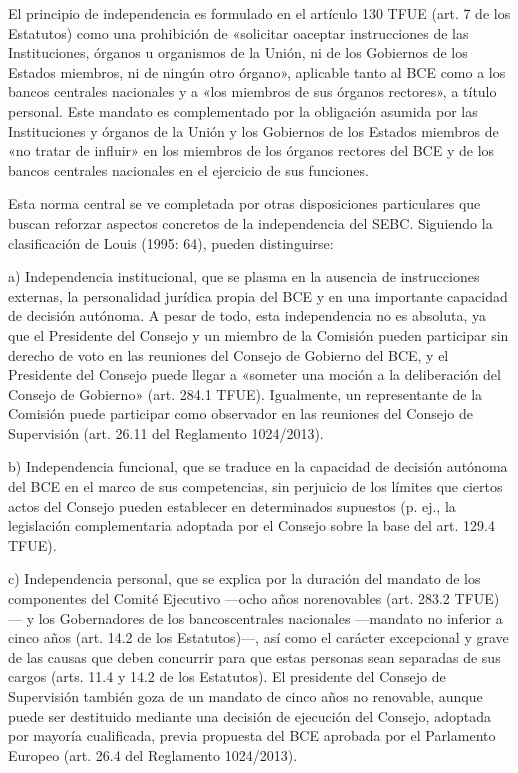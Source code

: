 \documentclass[10pt,a4paper]{article}
\begin{document}
El principio de independencia es formulado en el artículo 130 TFUE (art. 7 de los Estatutos) como una prohibición de «solicitar oaceptar instrucciones de las Instituciones, órganos u organismos de la Unión, ni de los Gobiernos de los Estados miembros, ni de ningún otro órgano», aplicable tanto al BCE como a los bancos centrales nacionales y a «los miembros de sus órganos rectores», a título personal. Este mandato es complementado por la obligación asumida por las Instituciones y órganos de la Unión y los Gobiernos de los Estados miembros de «no tratar de influir» en los miembros de los órganos rectores del BCE y de los bancos centrales nacionales en el ejercicio de sus funciones.

Esta norma central se ve completada por otras disposiciones particulares que buscan reforzar aspectos concretos de la independencia del SEBC. Siguiendo la clasificación de Louis (1995: 64), pueden distinguirse:

a) Independencia institucional, que se plasma en la ausencia de instrucciones externas, la personalidad jurídica propia del BCE y en una importante capacidad de decisión autónoma. A pesar de todo, esta independencia no es absoluta, ya que el Presidente del Consejo y un miembro de la Comisión pueden participar sin derecho de voto en las reuniones del Consejo de Gobierno del BCE, y el Presidente del Consejo puede llegar a «someter una moción a la deliberación del Consejo de Gobierno» (art. 284.1 TFUE). Igualmente, un representante de la Comisión puede participar como observador en las reuniones del Consejo de Supervisión (art. 26.11 del Reglamento 1024/2013).

b) Independencia funcional, que se traduce en la capacidad de decisión autónoma del BCE en el marco de sus competencias, sin perjuicio de los límites que ciertos actos del Consejo pueden establecer en determinados supuestos (p. ej., la legislación complementaria adoptada por el Consejo sobre la base del art. 129.4 TFUE).

c) Independencia personal, que se explica por la duración del mandato de los componentes del Comité Ejecutivo —ocho años norenovables (art. 283.2 TFUE)— y los Gobernadores de los bancoscentrales nacionales —mandato no inferior a cinco años (art. 14.2 de los Estatutos)—, así como el carácter excepcional y grave de las causas que deben concurrir para que estas personas sean separadas de sus cargos (arts. 11.4 y 14.2 de los Estatutos). El presidente del Consejo de Supervisión también goza de un mandato de cinco años no renovable, aunque puede ser destituido mediante una decisión de ejecución del Consejo, adoptada por mayoría cualificada, previa propuesta del BCE aprobada por el Parlamento Europeo (art. 26.4 del Reglamento 1024/2013).
\end{document}
